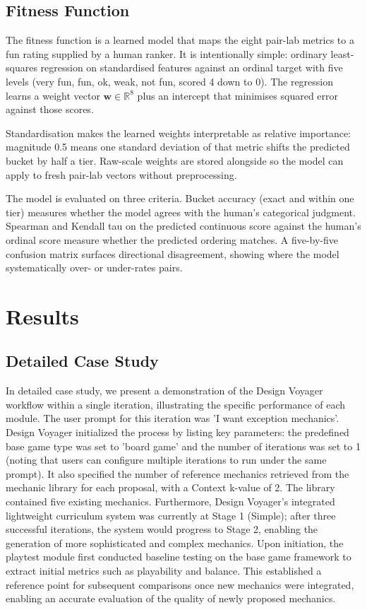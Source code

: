 \documentclass[conference]{IEEEtran}
\begin{document}
  \subsection{Fitness Function}                                                 
                                                                              
  The fitness function is a learned model that maps the eight pair-lab metrics  
  to a fun rating supplied by a human ranker. It is intentionally simple:     
  ordinary least-squares regression on standardised features against an ordinal 
  target with five levels (very fun, fun, ok, weak, not fun, scored 4 down to 
  0). The regression learns a weight vector $\mathbf{w} \in \mathbb{R}^8$ plus
  an intercept that minimises squared error against those scores.
                  
Standardisation makes the learned weights interpretable as relative importance: magnitude 0.5 means one standard deviation of that metric shifts the predicted bucket by half a tier. Raw-scale weights are stored alongside so the model can apply to fresh pair-lab vectors without preprocessing.       
                  
  The model is evaluated on three criteria. Bucket accuracy (exact and within
  one tier) measures whether the model agrees with the human's categorical      
  judgment. Spearman and Kendall tau on the predicted continuous score against
  the human's ordinal score measure whether the predicted ordering matches. A   
  five-by-five confusion matrix surfaces directional disagreement, showing where
   the model systematically over- or under-rates pairs.


\section{Results}
\subsection{Detailed Case Study}
In detailed case study, we present a demonstration of the Design Voyager workflow within a single iteration, illustrating the specific performance of each module. The user prompt for this iteration was 'I want exception mechanics'. Design Voyager initialized the process by listing key parameters: the predefined base game type was set to 'board game' and the number of iterations was set to 1 (noting that users can configure multiple iterations to run under the same prompt). It also specified the number of reference mechanics retrieved from the mechanic library for each proposal, with a Context k-value of 2. The library contained five existing mechanics. Furthermore, Design Voyager’s integrated lightweight curriculum system was currently at Stage 1 (Simple); after three successful iterations, the system would progress to Stage 2, enabling the generation of more sophisticated and complex mechanics. Upon initiation, the playtest module first conducted baseline testing on the base game framework to extract initial metrics such as playability and balance. This established a reference point for subsequent comparisons once new mechanics were integrated, enabling an accurate evaluation of the quality of newly proposed mechanics.
\end{document}
